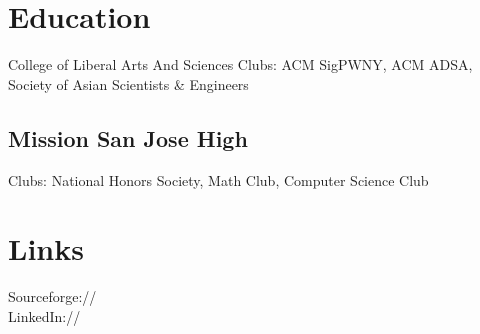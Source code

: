 \documentclass[]{deedy-resume-openfont}
\begin{document}
%
%
%
%



%
%

\begin{minipage}[t]{0.33\textwidth} 


\section{Education} 


College of Liberal Arts And Sciences
Clubs: ACM SigPWNY, ACM ADSA,
Society of Asian Scientists \& Engineers
\sectionsep

\subsection{Mission San Jose High}
Clubs: National Honors Society, \break
Math Club, Computer Science Club
\sectionsep



\section{Links} 
Sourceforge:// \href{https://sourceforge.net/u/sayan121}{} \\
LinkedIn://  \href{https://www.linkedin.com/in/sayan-b}{} \\
\sectionsep



\end{minipage}
\end{document}
